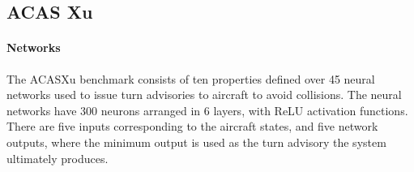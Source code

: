 \documentclass[oneside,11pt,dvipsnames]{book}
\numberwithin{equation}{section}
\theoremstyle{definition}
\theoremstyle{remark}
\begin{document}
\begin{table}
    \caption{Benchmark instances. U: \texttt{unsat}, S: \texttt{sat}, ?: \texttt{unknown}.}\label{tab:benchmarks}
\end{table}



\subsection{ACAS Xu}
\paragraph{Networks} The ACASXu benchmark consists of ten properties defined over 45 neural networks used to issue turn advisories to aircraft to avoid collisions. The neural networks have 300 neurons arranged in 6 layers, with ReLU activation functions. There are five inputs corresponding to the aircraft states, and five network outputs, where the minimum output is used as the turn advisory the system ultimately produces.
\end{document}
